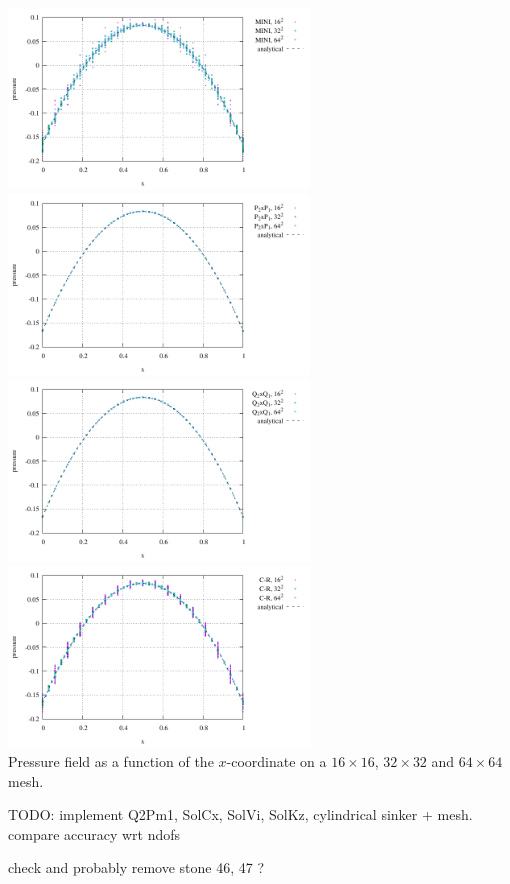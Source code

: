 \begin{center}
\includegraphics[width=8cm]{python_codes/fieldstone_112/results/pressMINI}
\includegraphics[width=8cm]{python_codes/fieldstone_112/results/pressP2P1}\\
\includegraphics[width=8cm]{python_codes/fieldstone_112/results/pressQ2Q1}
\includegraphics[width=8cm]{python_codes/fieldstone_112/results/pressCR}\\
{\captionfont Pressure field as a function of the $x$-coordinate on a $16\times16$,
$32\times 32$ and $64\times 64$ mesh.} 
\end{center}

TODO: implement Q2Pm1, SolCx, SolVi, SolKz, cylindrical sinker + mesh.
compare accuracy wrt ndofs

check and probably remove stone 46, 47 ?
